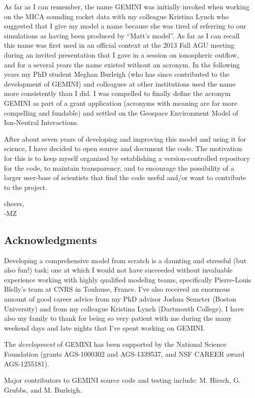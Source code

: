 \documentclass[11pt,letterpaper]{article}
\begin{document}
As far as I can remember, the name GEMINI was initially invoked when working on the MICA sounding rocket data with my colleague Kristina Lynch who suggested that I give my model a name because she was tired of referring to our simulations as having been produced by ``Matt's model''.  As far as I can recall this name was first used in an official context at the 2013 Fall AGU meeting during an invited presentation that I gave in a session on ionospheric outflow, and for a several years the name existed without an acronym.  In the following years my PhD student Meghan Burleigh (who has since contributed to the development of GEMINI) and colleagues at other institutions used the name more consistently than I did.  I was compelled to finally define the acronym GEMINI as part of a grant application (acronyms with meaning are far more compelling and fundable) and settled on the Geospace Environment Model of Ion-Neutral Interactions.  

After about seven years of developing and improving this model and using it for science, I have decided to open source and document the code.  The motivation for this is to keep myself organized by establishing a version-controlled repository for the code, to maintain transparency, and to encourage the possibility of a larger user-base of scientists that find the code useful and/or want to contribute to the project.  

cheers,\\
-MZ


\subsection{Acknowledgments}

Developing a comprehensive model from scratch is a daunting and stressful (but also fun!) task; one at which I would not have succeeded without invaluable experience working with highly qualified modeling teams, specifically Pierre-Louis Blelly's team at CNRS in Toulouse, France.  I've also received an enormous amount of good career advice from my PhD advisor Joshua Semeter (Boston University) and from my colleague Kristina Lynch (Dartmouth College).  I have also my family to thank for being so very patient with me during the many weekend days and late nights that I've spent working on GEMINI.  

The \emph{development} of GEMINI has been supported by the National Science Foundation (grants AGS-1000302 and AGS-1339537, and NSF CAREER award AGS-1255181).

Major contributors to GEMINI source code and testing include:  M. Hirsch, G. Grubbs, and M. Burleigh.


\pagebreak
\setcounter{page}{1}


\end{document}
